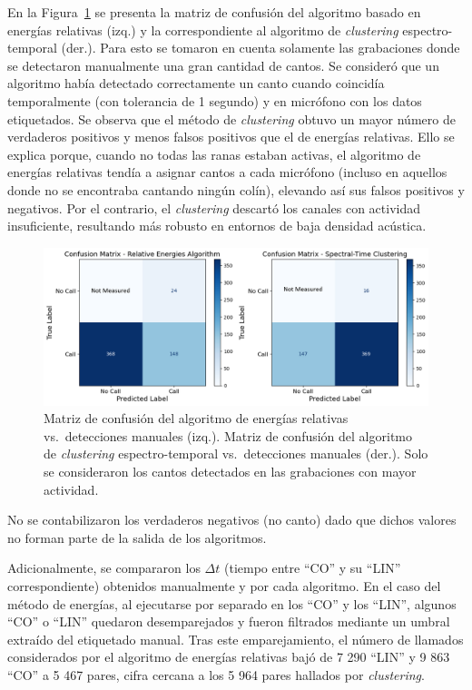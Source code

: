 En la Figura~\ref{fig:conf_mat_energies_cluster} se presenta la matriz de 
confusión del algoritmo basado en energías relativas (izq.) y 
la correspondiente al algoritmo de \textit{clustering} espectro-temporal (der.). 
Para esto se tomaron en cuenta solamente las grabaciones donde se detectaron
manualmente una gran cantidad de cantos.
Se consideró que un algoritmo había detectado correctamente un canto
cuando coincidía temporalmente (con tolerancia de 1 segundo) y en micrófono con los datos etiquetados.
Se observa 
que el método de \textit{clustering} obtuvo un mayor número de verdaderos 
positivos y menos falsos positivos que el de energías relativas. 
Ello se explica porque, cuando no todas las ranas estaban 
activas, el algoritmo de energías relativas tendía a asignar 
cantos a cada micrófono (incluso en aquellos donde no se encontraba cantando
ningún colín), elevando así sus falsos positivos y negativos. Por el 
contrario, el \textit{clustering} descartó los canales con actividad 
insuficiente, resultando más robusto en entornos de baja 
densidad acústica.  

\begin{figure}[ht]
  \centering
  \includegraphics[width=\columnwidth]{Graphics/confusion_matrix_clustering_energies.png}
  \caption{Matriz de confusión del algoritmo de energías relativas vs.\ detecciones manuales (izq.). Matriz de confusión del algoritmo de \textit{clustering} espectro-temporal vs.\ detecciones manuales (der.). Solo se consideraron los cantos detectados en las grabaciones con mayor actividad.}
  \label{fig:conf_mat_energies_cluster}
\end{figure}



No se contabilizaron los verdaderos negativos (no canto) dado 
que dichos valores no forman parte de la salida de los 
algoritmos.  

Adicionalmente, se compararon los \(\Delta t\) (tiempo entre 
“CO” y su “LIN” correspondiente) obtenidos manualmente y por 
cada algoritmo. En el caso del método de energías, al ejecutarse
por separado en los “CO” y los “LIN”, algunos “CO” 
o “LIN” quedaron desemparejados y fueron filtrados mediante un 
umbral extraído del etiquetado manual. Tras este emparejamiento, 
el número de llamados considerados por el algoritmo de energías 
relativas bajó de 7 290 “LIN” y 9 863 “CO” a 5 467 pares, cifra 
cercana a los 5 964 pares hallados por \textit{clustering}.  

